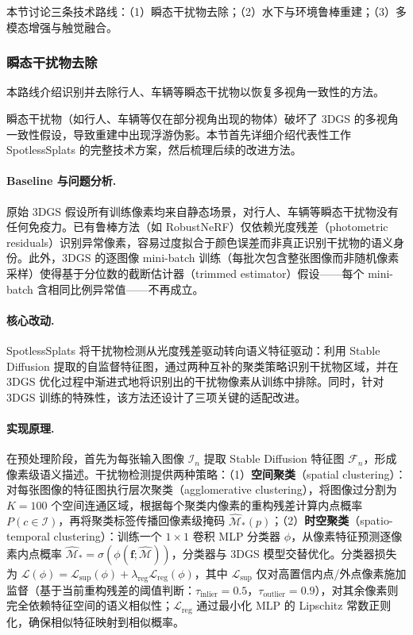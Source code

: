 本节讨论三条技术路线：（1）瞬态干扰物去除；（2）水下与环境鲁棒重建；（3）多模态增强与触觉融合。

\subsubsection{瞬态干扰物去除}

本路线介绍识别并去除行人、车辆等瞬态干扰物以恢复多视角一致性的方法。

瞬态干扰物（如行人、车辆等仅在部分视角出现的物体）破坏了 3DGS 的多视角一致性假设，导致重建中出现浮游伪影。本节首先详细介绍代表性工作 SpotlessSplats 的完整技术方案，然后梳理后续的改进方法。

\paragraph{Baseline 与问题分析.}原始 3DGS 假设所有训练像素均来自静态场景，对行人、车辆等瞬态干扰物没有任何免疫力。已有鲁棒方法（如 RobustNeRF）仅依赖光度残差（photometric residuals）识别异常像素，容易过度拟合于颜色误差而非真正识别干扰物的语义身份。此外，3DGS 的逐图像 mini-batch 训练（每批次包含整张图像而非随机像素采样）使得基于分位数的截断估计器（trimmed estimator）假设——每个 mini-batch 含相同比例异常值——不再成立。

\paragraph{核心改动.}SpotlessSplats 将干扰物检测从光度残差驱动转向语义特征驱动：利用 Stable Diffusion 提取的自监督特征图，通过两种互补的聚类策略识别干扰物区域，并在 3DGS 优化过程中渐进式地将识别出的干扰物像素从训练中排除。同时，针对 3DGS 训练的特殊性，该方法还设计了三项关键的适配改进。

\paragraph{实现原理.}在预处理阶段，首先为每张输入图像 $\mathcal{I}_n$ 提取 Stable Diffusion 特征图 $\mathcal{F}_n$，形成像素级语义描述。干扰物检测提供两种策略：（1）\textbf{空间聚类}（spatial clustering）：对每张图像的特征图执行层次聚类（agglomerative clustering），将图像过分割为 $K{=}100$ 个空间连通区域，根据每个聚类内像素的重构残差计算内点概率 $P(c \in \mathcal{I})$，再将聚类标签传播回像素级掩码 $\hat{\mathcal{M}}_*(p)$；（2）\textbf{时空聚类}（spatio-temporal clustering）：训练一个 $1{\times}1$ 卷积 MLP 分类器 $\phi$，从像素特征预测逐像素内点概率 $\hat{\mathcal{M}}_* = \sigma(\phi(\mathbf{f}; \hat{\mathcal{M}}))$，分类器与 3DGS 模型交替优化。分类器损失为 $\mathcal{L}(\phi) = \mathcal{L}_\text{sup}(\phi) + \lambda_\text{reg}\mathcal{L}_\text{reg}(\phi)$，其中 $\mathcal{L}_\text{sup}$ 仅对高置信内点/外点像素施加监督（基于当前重构残差的阈值判断：$\tau_\text{inlier}{=}0.5$，$\tau_\text{outlier}{=}0.9$），对其余像素则完全依赖特征空间的语义相似性；$\mathcal{L}_\text{reg}$ 通过最小化 MLP 的 Lipschitz 常数正则化，确保相似特征映射到相似概率。

